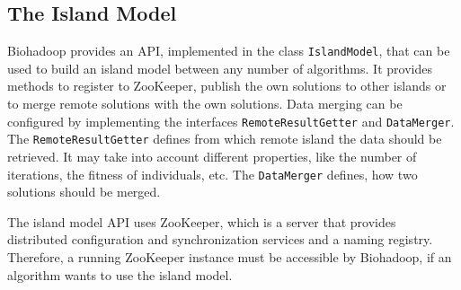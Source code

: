 \subsection{The Island Model}
\label{chap:impl:island-model}
% 
% 
% 
Biohadoop provides an API, implemented in the class \texttt{IslandModel}, that can be used to build an island model between any number of algorithms. It provides methods to register to ZooKeeper, publish the own solutions to other islands or to merge remote solutions with the own solutions. Data merging can be configured by implementing the interfaces \texttt{RemoteResultGetter} and \texttt{DataMerger}. The \texttt{RemoteResultGetter} defines from which remote island the data should be retrieved. It may take into account different properties, like the number of iterations, the fitness of individuals, etc. The \texttt{DataMerger} defines, how two solutions should be merged.

The island model API uses ZooKeeper, which is a server that provides distributed configuration and synchronization services and a naming registry. Therefore, a running ZooKeeper instance must be accessible by Biohadoop, if an algorithm wants to use the island model.

